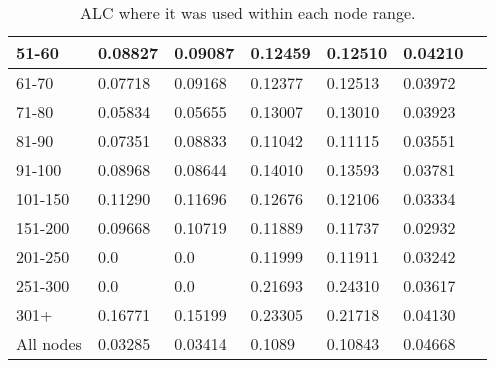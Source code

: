 \begin{table*}[h!]
\begin{tabular}{|l|l|l||l|l||l|l|}
        51-60     & 0.08827                                 & 0.09087                        & 0.12459                          & 0.12510               & 0.04210       &                \\ \hline
        61-70     & 0.07718                                 & 0.09168                        & 0.12377                          & 0.12513               & 0.03972       &                \\ \hline
        71-80     & 0.05834                                 & 0.05655                        & 0.13007                          & 0.13010               & 0.03923       &                \\ \hline
        81-90     & 0.07351                                 & 0.08833                        & 0.11042                          & 0.11115               & 0.03551       &                \\ \hline
        91-100    & 0.08968                                 & 0.08644                        & 0.14010                          & 0.13593               & 0.03781       &                \\ \hline
        101-150   & 0.11290                                 & 0.11696                        & 0.12676                          & 0.12106               & 0.03334       &                \\ \hline
        151-200   & 0.09668                                 & 0.10719                        & 0.11889                          & 0.11737               & 0.02932       &                \\ \hline
        201-250   & 0.0                                     & 0.0                            & 0.11999                          & 0.11911               & 0.03242       &                \\ \hline
        251-300   & 0.0                                     & 0.0                            & 0.21693                          & 0.24310               & 0.03617       &                \\ \hline
        301+      & 0.16771                                 & 0.15199                        & 0.23305                          & 0.21718               & 0.04130       &                \\ \hline
        All nodes & 0.03285                                 & 0.03414                        & 0.1089                           & 0.10843               & 0.04668       &                \\ \hline
    \end{tabular}
    \caption{ALC where it was used within each node range.}
    \label{tab:BLC-degree-based-ndcg}
\end{table*}

